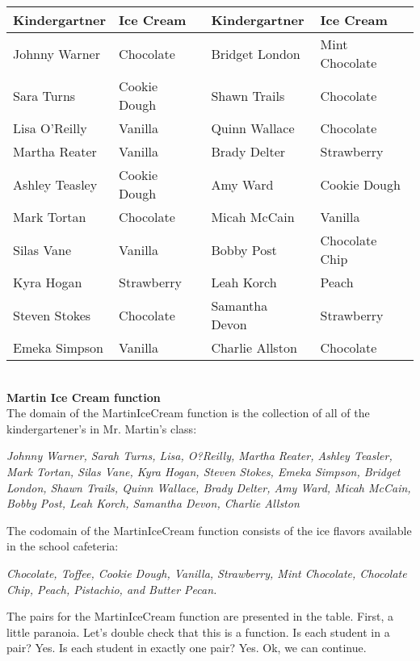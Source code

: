 \documentclass{ximera}
\begin{document}
\begin{center}

\begin{tabular}{|l|l|l|l|}
\hline
Kindergartner & Ice Cream & Kindergartner & Ice Cream \\\hline 
Johnny Warner & Chocolate & Bridget London & Mint Chocolate \\\hline 
Sara Turns & Cookie Dough & Shawn Trails & Chocolate \\\hline 
Lisa O'Reilly & Vanilla & Quinn Wallace & Chocolate \\\hline 
Martha Reater & Vanilla & Brady Delter & Strawberry \\\hline 
Ashley Teasley & Cookie Dough & Amy Ward & Cookie Dough \\\hline 
Mark Tortan & Chocolate & Micah McCain & Vanilla \\\hline 
Silas Vane & Vanilla & Bobby Post & Chocolate Chip \\\hline 
Kyra Hogan & Strawberry & Leah Korch & Peach \\\hline 
Steven Stokes & Chocolate & Samantha Devon & Strawberry \\\hline 
Emeka Simpson & Vanilla & Charlie Allston & Chocolate \\\hline 
\end{tabular}

\end{center}

\quad \\
\textbf{Martin Ice Cream function} \\

The domain of the MartinIceCream function is the collection of all of the kindergartener's in Mr. Martin's class: 

\textit{Johnny Warner, Sarah Turns, Lisa, O?Reilly, Martha Reater, Ashley Teasler, Mark Tortan, Silas Vane, Kyra Hogan, Steven Stokes, Emeka Simpson, Bridget London, Shawn Trails, Quinn Wallace, Brady Delter, Amy Ward, Micah McCain, Bobby Post, Leah Korch, Samantha Devon, Charlie Allston}


The codomain of the MartinIceCream function consists of the ice flavors available in the school cafeteria: 

\textit{Chocolate, Toffee, Cookie Dough, Vanilla, Strawberry, Mint Chocolate, Chocolate Chip, Peach, Pistachio, and Butter Pecan.}

The pairs for the MartinIceCream function are presented in the table. First, a little paranoia. Let's double check that this is a function.
Is each student in a pair? Yes. Is each student in exactly one pair? Yes. Ok, we can continue.
\end{document}
